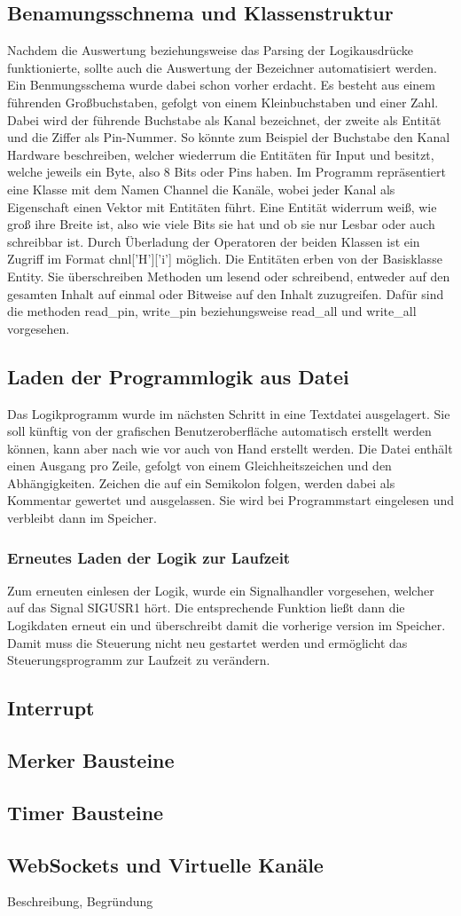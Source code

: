 \subsection{Benamungsschnema und Klassenstruktur}
Nachdem die Auswertung beziehungsweise das Parsing der Logikausdrücke funktionierte, sollte auch die Auswertung der Bezeichner automatisiert werden. Ein Benmungsschema wurde dabei schon vorher erdacht. Es besteht aus einem führenden Großbuchstaben, gefolgt von einem Kleinbuchstaben und einer Zahl. Dabei wird der führende Buchstabe als Kanal bezeichnet, der zweite als Entität und die Ziffer als Pin-Nummer. So könnte zum Beispiel der Buchstabe  den Kanal Hardware beschreiben, welcher  wiederrum die Entitäten  für Input und  besitzt, welche jeweils ein Byte, also 8 Bits oder Pins haben. Im Programm repräsentiert eine Klasse mit dem Namen Channel die Kanäle, wobei jeder Kanal als Eigenschaft einen Vektor mit Entitäten führt. Eine Entität widerrum weiß, wie groß ihre Breite ist, also wie viele Bits sie hat und ob sie nur Lesbar oder auch schreibbar ist. Durch Überladung der Operatoren der beiden Klassen ist ein Zugriff im Format chnl['H']['i'] möglich. Die Entitäten erben von der Basisklasse Entity. Sie überschreiben Methoden um lesend oder schreibend, entweder auf den gesamten Inhalt auf einmal oder Bitweise auf den Inhalt zuzugreifen. Dafür sind die methoden read\_pin, write\_pin beziehungsweise read\_all und write\_all vorgesehen. 

\subsection{Laden der Programmlogik aus Datei}
Das Logikprogramm wurde im nächsten Schritt in eine Textdatei ausgelagert. Sie soll künftig von der grafischen Benutzeroberfläche automatisch erstellt werden können, kann aber nach wie vor auch von Hand erstellt werden. Die Datei enthält einen Ausgang pro Zeile, gefolgt von einem Gleichheitszeichen und den Abhängigkeiten. Zeichen die auf ein Semikolon folgen, werden dabei als Kommentar gewertet und ausgelassen. Sie wird bei Programmstart eingelesen und verbleibt dann im Speicher.  
\subsubsection{Erneutes Laden der Logik zur Laufzeit}
Zum erneuten einlesen der Logik, wurde ein Signalhandler vorgesehen, welcher auf das Signal SIGUSR1 hört. Die entsprechende Funktion ließt dann die Logikdaten erneut ein und überschreibt damit die vorherige version im Speicher. Damit muss die Steuerung nicht neu gestartet werden und ermöglicht das Steuerungsprogramm zur Laufzeit zu verändern.
\subsection{Interrupt}
\subsection{Merker Bausteine}
\subsection{Timer Bausteine}
\subsection{WebSockets und Virtuelle Kanäle}


Beschreibung, Begründung

